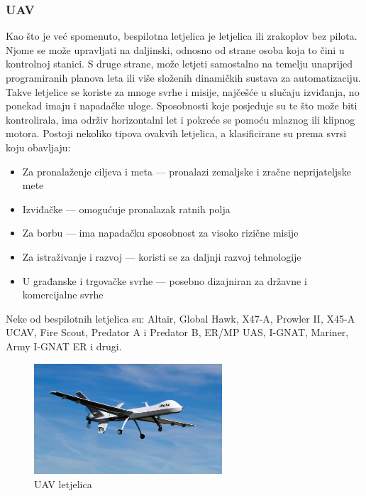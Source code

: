 \documentclass[times, utf8, diplomski]{fer}
\begin{document}
\subsubsection{UAV}\label{sec:UAV}
Kao što je već spomenuto, bespilotna letjelica je letjelica ili zrakoplov bez pilota. Njome se može upravljati na daljinski, odnosno od strane osoba koja to čini u kontrolnoj stanici. S druge strane, može letjeti samostalno na temelju unaprijed programiranih planova leta ili više složenih dinamičkih sustava za automatizaciju. Takve letjelice se koriste za mnoge svrhe i misije, najčešće u slučaju izviđanja, no ponekad imaju i napadačke uloge. Sposobnosti koje posjeduje su te što može biti kontrolirala, ima održiv horizontalni let i pokreće se pomoću mlaznog ili klipnog motora. Postoji nekoliko tipova ovakvih letjelica, a klasificirane su prema svrsi koju obavljaju:
\begin{itemize}
\item Za pronalaženje ciljeva i meta --- pronalazi zemaljske i zračne neprijateljske mete 
\item Izviđačke --- omogućuje pronalazak ratnih polja
\item Za borbu --- ima napadačku sposobnost za visoko rizične misije
\item Za istraživanje i razvoj --- koristi se za daljnji razvoj tehnologije
\item U građanske i trgovačke svrhe --- posebno dizajniran za državne i komercijalne svrhe
\end{itemize}
Neke  od  bespilotnih  letjelica  su:  Altair,  Global  Hawk,  X47-A, Prowler II, X45-A UCAV, Fire Scout, Predator A i Predator B, ER/MP UAS, I-GNAT, Mariner, Army I-GNAT ER i drugi.
\begin{figure}[htb]
\centering
\includegraphics[width=7cm]{img/UAV.png}
\caption{UAV letjelica\protect\footnotemark}
\label{fig:UAV letjelica}
\end{figure}
\end{document}
